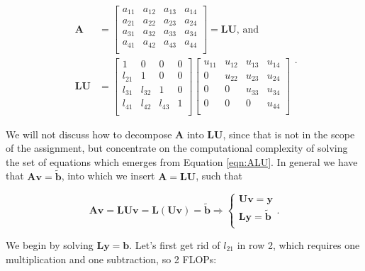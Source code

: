 \documentclass[]{article}
\begin{document}
\begin{equation}
\begin{split}
\label{eqn:ALU}
\mathbf{A} 
&= 
\left[ \begin{matrix}
a_{11} & a_{12} & a_{13} & a_{14} \\
a_{21} & a_{22} & a_{23} & a_{24} \\
a_{31} & a_{32} & a_{33} & a_{34} \\
a_{41} & a_{42} & a_{43} & a_{44} \\
\end{matrix} \right]
= \mathbf{LU} \text{, and} \\
\mathbf{LU} &=
\left[ \begin{matrix}
1 & 0      & 0      & 0      \\
l_{21} &      1 & 0      & 0      \\
l_{31} & l_{32} &      1 & 0      \\
l_{41} & l_{42} & l_{43} & 1      \\
\end{matrix} \right]
\left[ \begin{matrix}
u_{11} & u_{12} & u_{13} & u_{14} \\
0 & u_{22} & u_{23} & u_{24} \\
0 & 0 & u_{33} & u_{34} \\
0 & 0 & 0 & u_{44} \\
\end{matrix} \right]
\end{split}
\text{.}
\end{equation}

We will not discuss how to decompose $\mathbf{A}$ into $\mathbf{LU}$, since that is not in the scope of the assignment, but concentrate on the computational complexity of solving the set of equations which emerges from Equation \ref{eqn:ALU}. In general we have that $\mathbf{Av} = \mathbf{\tilde{b}}$, into which we insert $\mathbf{A} = \mathbf{LU}$, such that

\begin{equation*}
\mathbf{Av} = \mathbf{LUv} = \mathbf{L}(\mathbf{Uv}) = \mathbf{\tilde{b}} 
\Rightarrow 
\begin{cases} 
\mathbf{Uv} = \mathbf{y} \\
\mathbf{Ly} = \mathbf{\tilde{b}} \\
\end{cases}
\text{.}
\end{equation*}

We begin by solving $\mathbf{Ly} = \mathbf{b}$. Let's first get rid of $l_{21}$ in row 2, which requires one multiplication and one subtraction, so 2 FLOPs:
\end{document}
